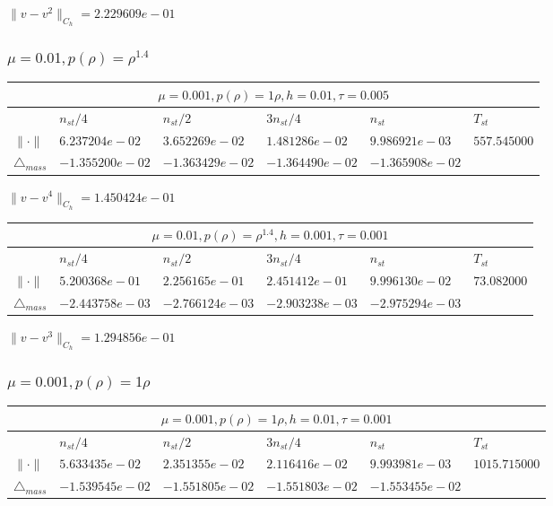 \documentclass[12pt,a4paper]{article}
\begin{document}
$\|v-v^{2}\|_{C_h} = 2.229609e-01$
\subsubsection{$\mu = 0.01, p(\rho) = \rho^{1.4} $}

\begin{tabular}{*{6}{|l}|}
    \hline
     \\
    \hline
    &$n_{st}/4 $&$ n_{st}/2$&$3n_{st}/4$&$n_{st}$&$T_{st}$ \\
    \hline
$\|\cdot \|$& $6.237204e-02$ & $3.652269e-02$ & $1.481286e-02$ & $9.986921e-03$ &$557.545000$\\
\hline
$\triangle_{mass}$& $-1.355200e-02$ & $-1.363429e-02$ & $-1.364490e-02$ & $-1.365908e-02$ &\\
\hline
\end{tabular}

$\|v-v^{4}\|_{C_h} = 1.450424e-01$


\begin{tabular}{*{6}{|l}|}
    \hline
     \\
    \hline
    &$n_{st}/4 $&$ n_{st}/2$&$3n_{st}/4$&$n_{st}$&$T_{st}$ \\
    \hline
$\|\cdot \|$& $5.200368e-01$ & $2.256165e-01$ & $2.451412e-01$ & $9.996130e-02$ &$73.082000$\\
\hline
$\triangle_{mass}$& $-2.443758e-03$ & $-2.766124e-03$ & $-2.903238e-03$ & $-2.975294e-03$ &\\
\hline    
\end{tabular}

$\|v-v^{3}\|_{C_h} = 1.294856e-01$

\subsubsection{$\mu = 0.001, p(\rho) = 1\rho $}

\begin{tabular}{*{6}{|l}|}
    \hline
     \\
    \hline
    &$n_{st}/4 $&$ n_{st}/2$&$3n_{st}/4$&$n_{st}$&$T_{st}$ \\
    \hline
    $\|\cdot \|$& $5.633435e-02$ & $2.351355e-02$ & $2.116416e-02$ & $9.993981e-03$ &$1015.715000$\\
\hline
$\triangle_{mass}$& $-1.539545e-02$ & $-1.551805e-02$ & $-1.551803e-02$ & $-1.553455e-02$ &\\
\hline
\end{tabular}
\end{document}

